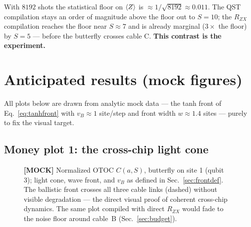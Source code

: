 \documentclass[11pt]{article}
\begin{document}
With $8192$ shots the statistical floor on $\expval{Z}$ is
$\approx 1/\sqrt{8192} \approx 0.011$. The QST compilation stays an order of
magnitude above the floor out to $S=10$; the $R_{ZX}$ compilation reaches the
floor near $S\approx7$ and is already marginal ($3\times$ the floor) by
$S=5$ --- before the butterfly crosses cable C. \textbf{This contrast is the
experiment.}

\section{Anticipated results (mock figures)}

All plots below are drawn from analytic mock data --- the tanh front of
Eq.~\eqref{eq:tanhfront} with $v_B \approx 1$ site/step and front width
$w \approx 1.4$ sites --- purely to fix the visual target.

\subsection{Money plot 1: the cross-chip light cone}

\begin{figure}[h]
\centering
{}
\caption{\textbf{[MOCK]} Normalized OTOC $C(a,S)$, butterfly on site 1
(qubit 3); light cone, wave front, and $v_B$ as defined in
Sec.~\ref{sec:frontdef}. The ballistic front crosses all three cable links
(dashed) without visible degradation --- the direct visual proof of coherent
cross-chip dynamics. The same plot compiled with direct $R_{ZX}$ would fade
to the noise floor around cable~B (Sec.~\ref{sec:budget}).}
\label{fig:lightcone}
\end{figure}
\end{document}
